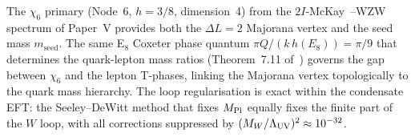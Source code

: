 \begin{remark}
\label{P7:rem:neutrino}
The $\chi_6$ primary (Node~6, $h=3/8$, dimension~4) from the
$2I$-McKay~\cite{McKay1980}--WZW spectrum of Paper~V provides both the
$\Delta L=2$ Majorana vertex and the seed mass $m_\mathrm{seed}$.
The same E$_8$ Coxeter phase quantum $\pi Q/(k\,h(E_8))=\pi/9$
that determines the quark-lepton mass ratios
(Theorem~7.11 of~\cite{Paper5}) governs the gap between $\chi_6$
and the lepton T-phases, linking the Majorana vertex topologically
to the quark mass hierarchy.
The loop regularisation is exact within the condensate EFT:
the Seeley--DeWitt method that fixes $M_{\mathrm{Pl}}$ equally fixes the finite
part of the $W$ loop, with all corrections
suppressed by $(M_W/\Lambda_{\mathrm{UV}})^2\approx10^{-32}$.
\end{remark}
